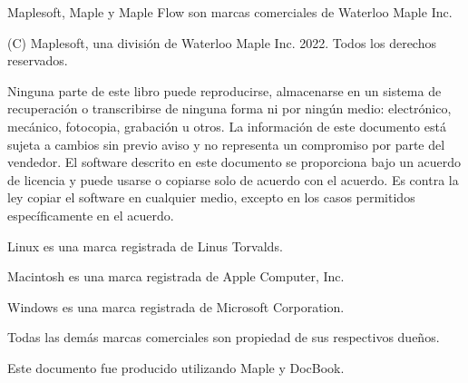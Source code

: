 \documentclass[
	spanish, %
	letterpaper, oneside
]{article}
\begin{document}
	
\templatePortrait

\templatePagecfg

\begin{abstractd}
Maplesoft, Maple y Maple Flow son marcas comerciales de Waterloo Maple Inc.

(C) Maplesoft, una división de Waterloo Maple Inc. 2022. Todos los derechos reservados.

Ninguna parte de este libro puede reproducirse, almacenarse en un sistema de recuperación o transcribirse de ninguna forma ni por ningún medio: electrónico, mecánico, fotocopia, grabación u otros. La información de este documento está sujeta a cambios sin previo aviso y no representa un compromiso por parte del vendedor. El software descrito en este documento se proporciona bajo un acuerdo de licencia y puede usarse o copiarse solo de acuerdo con el acuerdo. Es contra la ley copiar el software en cualquier medio, excepto en los casos permitidos específicamente en el acuerdo.

Linux es una marca registrada de Linus Torvalds.

Macintosh es una marca registrada de Apple Computer, Inc.

Windows es una marca registrada de Microsoft Corporation.

Todas las demás marcas comerciales son propiedad de sus respectivos dueños.

Este documento fue producido utilizando Maple y DocBook.

\end{abstractd}

\templateIndex

\templateFinalcfg




\end{document}
